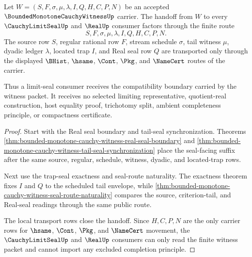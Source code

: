 \begin{theorem}
\label{thm:bounded-monotone-cauchy-witness-limit-seal-handoff}
Let $W=(S,F,\sigma,\mu,\lambda,I,Q,H,C,P,N)$ be an accepted $\BoundedMonotoneCauchyWitnessUp$ carrier. The handoff from $W$ to every $\CauchyLimitSealUp$ and $\RealUp$ consumer factors through the finite route
$$
S,F,\sigma,\mu,\lambda,I,Q,H,C,P,N.
$$
The source row $S$, regular rational row $F$, stream schedule $\sigma$, tail witness $\mu$, dyadic ledger $\lambda$, located trap $I$, and Real seal row $Q$ are transported only through the displayed $\BHist$, $\hsame$, $\Cont$, $\Pkg$, and $\NameCert$ routes of the carrier.

Thus a limit-seal consumer receives the compatibility boundary carried by the witness packet. It receives no selected limiting representative, quotient-real construction, host equality proof, trichotomy split, ambient completeness principle, or compactness certificate.
\end{theorem}
\begin{proof}
Start with the Real seal boundary and tail-seal synchronization. Theorems \autoref{thm:bounded-monotone-cauchy-witness-real-seal-boundary} and \autoref{thm:bounded-monotone-cauchy-witness-tail-seal-synchronization} place the seal-facing suffix after the same source, regular, schedule, witness, dyadic, and located-trap rows.

Next use the trap-seal exactness and seal-route naturality. The exactness theorem fixes $I$ and $Q$ to the scheduled tail envelope, while \autoref{thm:bounded-monotone-cauchy-witness-seal-route-naturality} compares the source, criterion-tail, and Real-seal readings through the same public route.

The local transport rows close the handoff. Since $H,C,P,N$ are the only carrier rows for $\hsame$, $\Cont$, $\Pkg$, and $\NameCert$ movement, the $\CauchyLimitSealUp$ and $\RealUp$ consumers can only read the finite witness packet and cannot import any excluded completion principle.
\end{proof}

